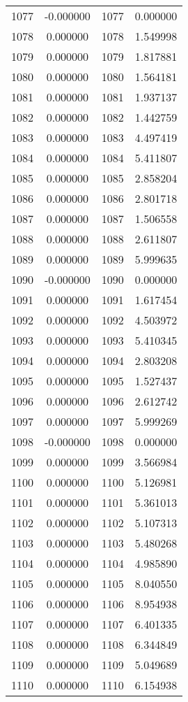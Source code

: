 \documentclass[12pt]{article}
\begin{document}
\begin{longtable}{@{}cccc@{}}
1077 & -0.000000 & 1077 & 0.000000 \\
1078 & 0.000000 & 1078 & 1.549998 \\
1079 & 0.000000 & 1079 & 1.817881 \\
1080 & 0.000000 & 1080 & 1.564181 \\
1081 & 0.000000 & 1081 & 1.937137 \\
1082 & 0.000000 & 1082 & 1.442759 \\
1083 & 0.000000 & 1083 & 4.497419 \\
1084 & 0.000000 & 1084 & 5.411807 \\
1085 & 0.000000 & 1085 & 2.858204 \\
1086 & 0.000000 & 1086 & 2.801718 \\
1087 & 0.000000 & 1087 & 1.506558 \\
1088 & 0.000000 & 1088 & 2.611807 \\
1089 & 0.000000 & 1089 & 5.999635 \\
1090 & -0.000000 & 1090 & 0.000000 \\
1091 & 0.000000 & 1091 & 1.617454 \\
1092 & 0.000000 & 1092 & 4.503972 \\
1093 & 0.000000 & 1093 & 5.410345 \\
1094 & 0.000000 & 1094 & 2.803208 \\
1095 & 0.000000 & 1095 & 1.527437 \\
1096 & 0.000000 & 1096 & 2.612742 \\
1097 & 0.000000 & 1097 & 5.999269 \\
1098 & -0.000000 & 1098 & 0.000000 \\
1099 & 0.000000 & 1099 & 3.566984 \\
1100 & 0.000000 & 1100 & 5.126981 \\
1101 & 0.000000 & 1101 & 5.361013 \\
1102 & 0.000000 & 1102 & 5.107313 \\
1103 & 0.000000 & 1103 & 5.480268 \\
1104 & 0.000000 & 1104 & 4.985890 \\
1105 & 0.000000 & 1105 & 8.040550 \\
1106 & 0.000000 & 1106 & 8.954938 \\
1107 & 0.000000 & 1107 & 6.401335 \\
1108 & 0.000000 & 1108 & 6.344849 \\
1109 & 0.000000 & 1109 & 5.049689 \\
1110 & 0.000000 & 1110 & 6.154938 \\

\end{longtable}
\end{document}
